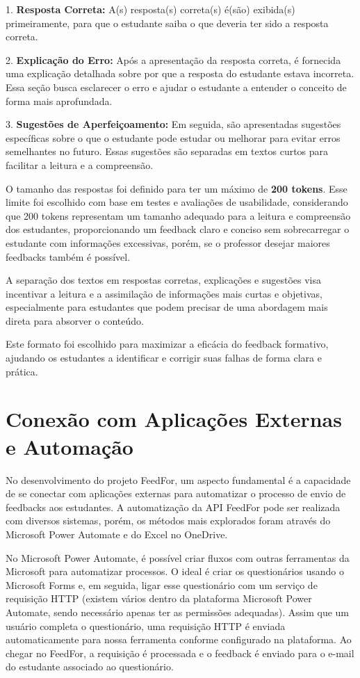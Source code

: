1. \textbf{Resposta Correta:} A(s) resposta(s) correta(s) é(são) exibida(s) primeiramente, para que o estudante saiba o que deveria ter sido a resposta correta.

2. \textbf{Explicação do Erro:} Após a apresentação da resposta correta, é fornecida uma explicação detalhada sobre por que a resposta do estudante estava incorreta. Essa seção busca esclarecer o erro e ajudar o estudante a entender o conceito de forma mais aprofundada.

3. \textbf{Sugestões de Aperfeiçoamento:} Em seguida, são apresentadas sugestões específicas sobre o que o estudante pode estudar ou melhorar para evitar erros semelhantes no futuro. Essas sugestões são separadas em textos curtos para facilitar a leitura e a compreensão.

O tamanho das respostas foi definido para ter um máximo de \textbf{200 tokens}. Esse limite foi escolhido com base em testes e avaliações de usabilidade, considerando que 200 tokens representam um tamanho adequado para a leitura e compreensão dos estudantes, proporcionando um feedback claro e conciso sem sobrecarregar o estudante com informações excessivas, porém, se o professor desejar maiores feedbacks também é possível.

A separação dos textos em respostas corretas, explicações e sugestões visa incentivar a leitura e a assimilação de informações mais curtas e objetivas, especialmente para estudantes que podem precisar de uma abordagem mais direta para absorver o conteúdo.

Este formato foi escolhido para maximizar a eficácia do feedback formativo, ajudando os estudantes a identificar e corrigir suas falhas de forma clara e prática.

\section{Conexão com Aplicações Externas e Automação}

No desenvolvimento do projeto FeedFor, um aspecto fundamental é a capacidade de se conectar com aplicações externas para automatizar o processo de envio de feedbacks aos estudantes. A automatização da API FeedFor pode ser realizada com diversos sistemas, porém, os métodos mais explorados foram através do Microsoft Power Automate e do Excel no OneDrive.

No Microsoft Power Automate, é possível criar fluxos com outras ferramentas da Microsoft para automatizar processos. O ideal é criar os questionários usando o Microsoft Forms e, em seguida, ligar esse questionário com um serviço de requisição HTTP (existem vários dentro da plataforma Microsoft Power Automate, sendo necessário apenas ter as permissões adequadas). Assim que um usuário completa o questionário, uma requisição HTTP é enviada automaticamente para nossa ferramenta conforme configurado na plataforma. Ao chegar no FeedFor, a requisição é processada e o feedback é enviado para o e-mail do estudante associado ao questionário.

